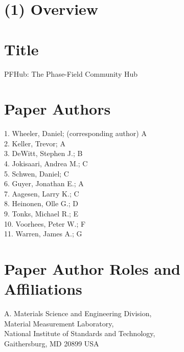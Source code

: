 \documentclass{jors}
\begin{document}
\newcommand\githublink[1]{\href{https://github.com/#1/}{\texttt{\textbf{@#1}}}}




\section*{(1) Overview}

\vspace{0.5cm}

\section*{Title}
\par\bigskip
PFHub: The Phase-Field Community Hub\\[\baselineskip]

\section*{Paper Authors}

1. Wheeler, Daniel; (corresponding author) A\\
2. Keller, Trevor; A\\
3. DeWitt, Stephen J.; B\\
4. Jokisaari, Andrea M.; C\\
5. Schwen, Daniel; C\\
6. Guyer, Jonathan E.; A\\
7. Aagesen, Larry K.; C\\
8. Heinonen, Olle G.; D\\
9. Tonks, Michael R.; E\\
10. Voorhees, Peter W.; F\\
11. Warren, James A.; G

\section*{Paper Author Roles and Affiliations}

A. Materials Science and Engineering Division, \\
Material Measurement Laboratory, \\
National Institute of Standards and Technology,\\
Gaithersburg, MD 20899 USA
\end{document}
